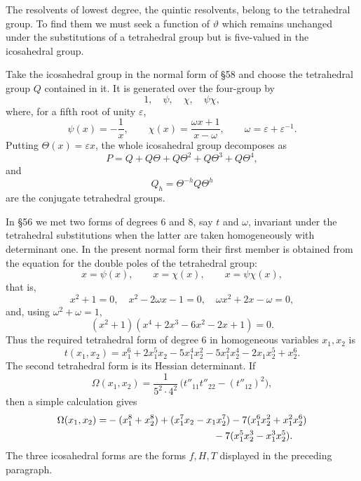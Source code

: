 \documentclass[11pt,a4paper]{book}
\newcommand{\omegaT}{\Omega}
\begin{document}
The resolvents of lowest degree, the quintic resolvents, belong to the tetrahedral group.  To find them we must seek a function of $\vartheta$ which remains unchanged under the substitutions of a tetrahedral group but is five-valued in the icosahedral group.

Take the icosahedral group in the normal form of \S 58 and choose the tetrahedral group $Q$ contained in it.  It is generated over the four-group by
\begin{equation}
 1,\quad \psi,\quad \chi,\quad \psi\chi,
\end{equation}
where, for a fifth root of unity $\varepsilon$,
\begin{equation}
 \psi(x)=-\frac1x,
 \qquad
 \chi(x)=\frac{\omega x+1}{x-\omega},
 \qquad
 \omega=\varepsilon+\varepsilon^{-1}.
\end{equation}
Putting $\Theta(x)=\varepsilon x$, the whole icosahedral group decomposes as
\begin{equation}
 P=Q+Q\Theta+Q\Theta^2+Q\Theta^3+Q\Theta^4,
\end{equation}
and
\begin{equation}
 Q_h=\Theta^{-h}Q\Theta^h
\end{equation}
are the conjugate tetrahedral groups.

In \S 56 we met two forms of degrees $6$ and $8$, say $t$ and $\omega$, invariant under the tetrahedral substitutions when the latter are taken homogeneously with determinant one.  In the present normal form their first member is obtained from the equation for the double poles of the tetrahedral group:
\[
 x=\psi(x),\qquad x=\chi(x),\qquad x=\psi\chi(x),
\]
that is,
\[
 x^2+1=0,
 \quad x^2-2\omega x-1=0,
 \quad \omega x^2+2x-
\omega=0,
\]
and, using $\omega^2+\omega=1$,
\begin{equation}
 (x^2+1)(x^4+2x^3-6x^2-2x+1)=0.
\end{equation}
Thus the required tetrahedral form of degree $6$ in homogeneous variables $x_1,x_2$ is
\begin{equation}
 t(x_1,x_2)=x_1^6+2x_1^5x_2-5x_1^4x_2^2-5x_1^2x_2^4-2x_1x_2^5+x_2^6.
\end{equation}
The second tetrahedral form is its Hessian determinant.  If
\begin{equation}
 \omegaT(x_1,x_2)=\frac{1}{5^2\cdot4^2}
 \,\bigl(t''_{11}t''_{22}-(t''_{12})^2\bigr),
\end{equation}
then a simple calculation gives
\begin{align}
 \omegaT(x_1,x_2)=&-(x_1^8+x_2^8)+(x_1^7x_2-x_1x_2^7)
      -7(x_1^6x_2^2+x_1^2x_2^6)\notag\\
 &\hspace{1.5in}-7(x_1^5x_2^3-x_1^3x_2^5).
\end{align}
The three icosahedral forms are the forms $f,H,T$ displayed in the preceding paragraph.
\end{document}
